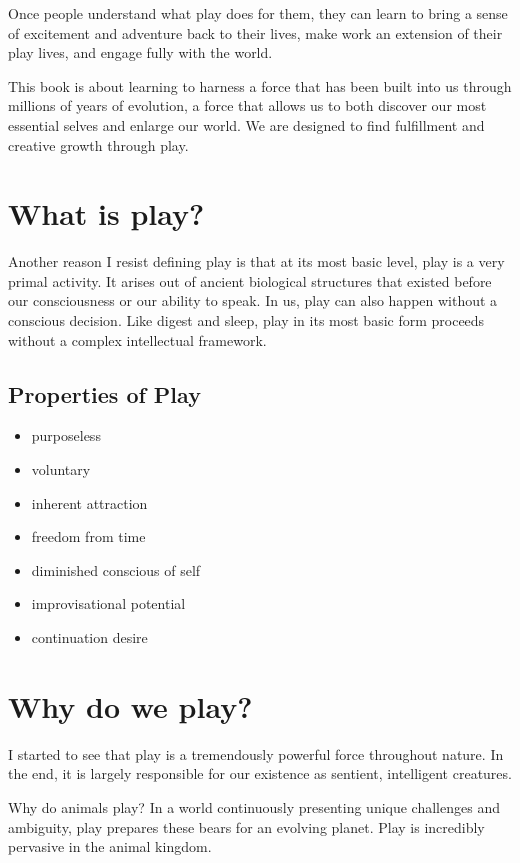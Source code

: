 \documentclass[ebook,12pt,oneside,openany]{memoir}
\begin{document}
Once people understand what play does for them, they can learn to bring a sense of excitement and adventure back to their lives,
make work an extension of their play lives, and engage fully with the world.

This book is about learning to harness a force that has been built into us through millions of years of evolution,
a force that allows us to both discover our most essential selves and enlarge our world.
We are designed to find fulfillment and creative growth through play.

\section{What is play?}
Another reason I resist defining play is that at its most basic level,
play is a very primal activity. 
It arises out of ancient biological structures that existed before our consciousness or our ability to speak.
In us, play can also happen without a conscious decision. 
Like digest and sleep, play in its most basic form proceeds without a complex intellectual framework.

\subsection{Properties of Play}
\begin{itemize}
    \item purposeless
    \item voluntary
    \item inherent attraction
    \item freedom from time
    \item diminished conscious of self
    \item improvisational potential
    \item continuation desire
\end{itemize}

\section{Why do we play?}
I started to see that play is a tremendously powerful force throughout nature.
In the end, it is largely responsible for our existence as sentient, intelligent creatures.

Why do animals play? In a world continuously presenting unique challenges and ambiguity, play prepares these bears for an evolving planet.
Play is incredibly pervasive in the animal kingdom. 
\end{document}
